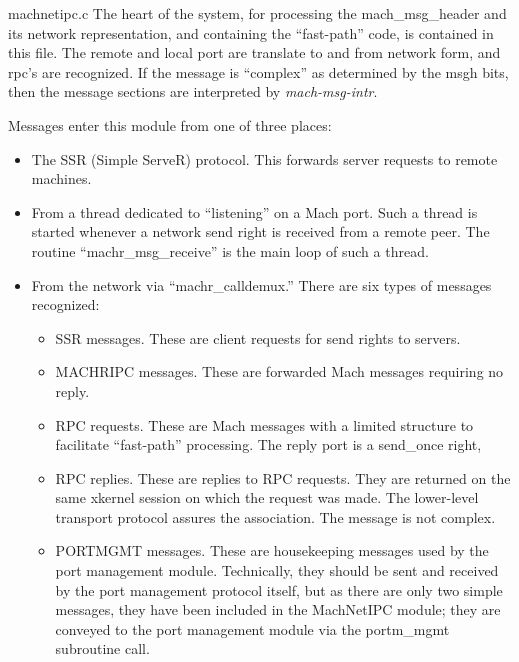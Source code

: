 \begin{description}

\item {machnetipc.c}
The heart of the system, for processing the mach\_msg\_header and its
network representation, and containing the ``fast-path'' code, is
contained in this file.  The remote and local port are translate to
and from network form, and rpc's are recognized.  If the message is
``complex'' as determined by the msgh bits, then the message sections
are interpreted by {\em mach-msg-intr}.

Messages enter this module from one of three places:
\begin{itemize}
\item The SSR (Simple ServeR) protocol.	 This forwards server requests
to remote machines.

\item From a thread dedicated to ``listening'' on a Mach port.  Such a
thread is started whenever a network send right is received from a
remote peer.  The routine ``machr\_msg\_receive'' is the main loop of such
a thread.

\item From the network via ``machr\_calldemux.''  There are six types
of messages recognized:

\begin{itemize}
\item SSR messages.  These are client requests for send rights to servers.

\item MACHRIPC messages.  These are forwarded Mach messages requiring no
reply.

\item RPC requests.  These are Mach messages with a limited structure to
facilitate ``fast-path'' processing.  The reply port is a send\_once right,

\item RPC replies.  These are replies to RPC requests.  They are returned
on the same xkernel session on which the request was made.  The lower-level
transport protocol assures the association.  The message is not complex.

\item PORTMGMT messages.  These are housekeeping messages used by the
port management module.  Technically, they should be sent and received
by the port management protocol itself, but as there are only two
simple messages, they have been included in the MachNetIPC module;
they are conveyed to the port management module via the portm\_mgmt
subroutine call.
\end{itemize}
\end{itemize}


\end{description}
